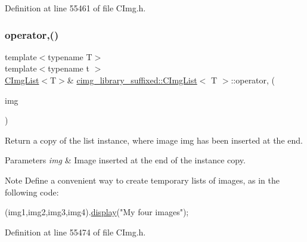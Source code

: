 Definition at line 55461 of file C\+Img.\+h.

\mbox{\label{structcimg__library__suffixed_1_1CImgList_a42e29470c891aa44dbc3bb21b32b7d1a}} 
\subsubsection{\texorpdfstring{operator,()}{operator,()}\hspace{0.1cm}{\footnotesize\ttfamily [1/2]}}
{\footnotesize\ttfamily template$<$typename T$>$ \\
template$<$typename t $>$ \\
\hyperlink{structcimg__library__suffixed_1_1CImgList}{C\+Img\+List}$<$T$>$\& \hyperlink{structcimg__library__suffixed_1_1CImgList}{cimg\+\_\+library\+\_\+suffixed\+::\+C\+Img\+List}$<$ T $>$\+::operator, (\begin{DoxyParamCaption}\item[{const \hyperlink{structcimg__library__suffixed_1_1CImg}{C\+Img}$<$ t $>$ \&}]{img }\end{DoxyParamCaption})\hspace{0.3cm}{\ttfamily [inline]}}



Return a copy of the list instance, where image {\ttfamily img} has been inserted at the end. 


\begin{DoxyParams}{Parameters}
{\em img} & Image inserted at the end of the instance copy. \\
\hline
\end{DoxyParams}
\begin{DoxyNote}{Note}
Define a convenient way to create temporary lists of images, as in the following code\+: 
\begin{DoxyCode}
(img1,img2,img3,img4).\hyperlink{structcimg__library__suffixed_1_1CImgList_a6d3f568606b4048412d8e61c947be6aa}{display}(\textcolor{stringliteral}{"My four images"});
\end{DoxyCode}
 
\end{DoxyNote}


Definition at line 55474 of file C\+Img.\+h.

